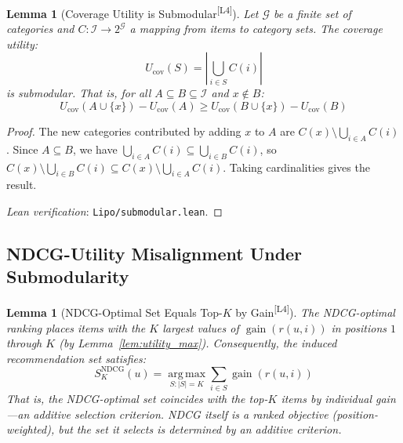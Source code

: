 \documentclass[11pt,a4paper]{article}
\theoremstyle{definition}
\theoremstyle{plain}
\newtheorem{lemma}[theorem]{Lemma}
\theoremstyle{remark}
\newcommand{\NDCG}{\mathrm{NDCG}}
\newcommand{\argmax}{\operatorname*{arg\,max}}
\DeclareMathOperator{\gain}{gain}
\newcommand{\leanmark}{\textsuperscript{\textcolor{green!50!black}{[L4]}}}
\begin{document}
\begin{lemma}[Coverage Utility is Submodular\leanmark]
\label{lem:coverage_submodular}
Let $\mathcal{G}$ be a finite set of categories and $C: \mathcal{I} \to 2^{\mathcal{G}}$ a mapping from items to category sets. The coverage utility:
\begin{equation}
    U_{\text{cov}}(S) = \left|\bigcup_{i \in S} C(i)\right|
\end{equation}
is submodular. That is, for all $A \subseteq B \subseteq \mathcal{I}$ and $x \notin B$:
\begin{equation}
    U_{\text{cov}}(A \cup \{x\}) - U_{\text{cov}}(A) \geq U_{\text{cov}}(B \cup \{x\}) - U_{\text{cov}}(B)
\end{equation}
\end{lemma}

\begin{proof}
The new categories contributed by adding $x$ to $A$ are $C(x) \setminus \bigcup_{i \in A} C(i)$. Since $A \subseteq B$, we have $\bigcup_{i \in A} C(i) \subseteq \bigcup_{i \in B} C(i)$, so $C(x) \setminus \bigcup_{i \in B} C(i) \subseteq C(x) \setminus \bigcup_{i \in A} C(i)$. Taking cardinalities gives the result.

\smallskip
\noindent\textit{Lean verification}: \texttt{Lipo/submodular.lean}.
\end{proof}

\subsection{NDCG-Utility Misalignment Under Submodularity}
\label{subsec:h2_misalignment}

\begin{lemma}[NDCG-Optimal Set Equals Top-$K$ by Gain\leanmark]
\label{lem:ndcg_additive}
The NDCG-optimal ranking places items with the $K$ largest values of $\gain(r(u, i))$ in positions $1$ through $K$ (by Lemma~\ref{lem:utility_max}). Consequently, the induced recommendation set satisfies:
\begin{equation}
    S_K^{\NDCG}(u) = \argmax_{S: |S| = K} \sum_{i \in S} \gain(r(u, i))
\end{equation}
That is, the NDCG-optimal \emph{set} coincides with the top-$K$ items by individual gain---an additive selection criterion. NDCG itself is a ranked objective (position-weighted), but the set it selects is determined by an additive criterion.
\end{lemma}
\end{document}

